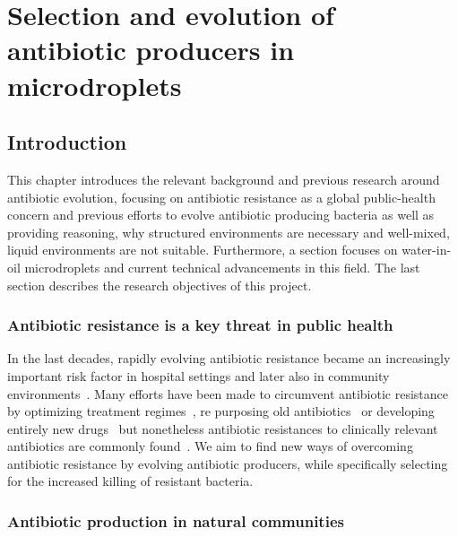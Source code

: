 \part{Selection and evolution of antibiotic producers in microdroplets }
\chapter{Introduction}
\label{chap:droplets_intro}

This chapter introduces the relevant background and previous research around antibiotic evolution, focusing on antibiotic resistance as a global public-health concern and previous efforts to evolve antibiotic producing bacteria as well as providing reasoning, why structured environments are necessary and well-mixed, liquid environments are not suitable. Furthermore, a section focuses on water-in-oil microdroplets and current technical advancements in this field. The last section describes the research objectives of this project.

\section{Antibiotic resistance is a key threat in public health}

In the last decades, rapidly evolving antibiotic resistance became an increasingly important risk factor in hospital settings and later also in community environments~\cite{David2010-az}. Many efforts have been made to circumvent antibiotic resistance by optimizing treatment regimes~\cite{Kim2014-lq}, re purposing old antibiotics~\cite{Kim2019-qk} or developing entirely new drugs~\cite{Lin2017-sh} but nonetheless antibiotic resistances to clinically relevant antibiotics are commonly found~\cite{Jernigan2020-ro}. We aim to find new ways of overcoming antibiotic resistance by evolving antibiotic producers, while specifically selecting for the increased killing of resistant bacteria.

\section{Antibiotic production in natural communities}
\label{sec:natural_production}

